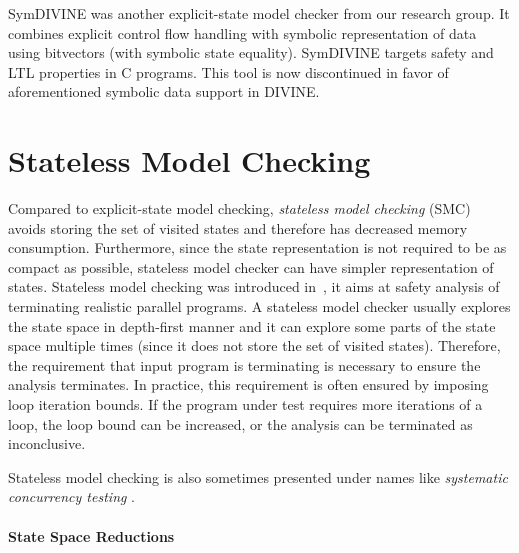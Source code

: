 SymDIVINE  was another explicit-state model checker from our research group.
It combines explicit control flow handling with symbolic representation of data
using bitvectors (with symbolic state equality).
SymDIVINE targets safety and LTL properties in C programs.
This tool is now discontinued in favor of aforementioned symbolic data support
in DIVINE.


\section{Stateless Model Checking}\label{sec:stateoftheart:smc}

Compared to explicit-state model checking, \emph{stateless model checking}
(SMC) avoids storing the set of visited states and therefore has decreased
memory consumption.
Furthermore, since the state representation is not required to be as compact as
possible, stateless model checker can have simpler representation of states.
Stateless model checking was introduced in~, it aims at
safety analysis of terminating realistic parallel programs.
A stateless model checker usually explores the state space in depth-first
manner and it can explore some parts of the state space multiple times (since
it does not store the set of visited states).
Therefore, the requirement that input program is terminating is necessary to
ensure the analysis terminates.
In practice, this requirement is often ensured by imposing loop iteration
bounds.
If the program under test requires more iterations of a loop, the loop bound
can be increased, or the analysis can be terminated as inconclusive.

Stateless model checking is also sometimes presented under names like \emph{systematic concurrency testing} .

\paragraph{State Space Reductions}


